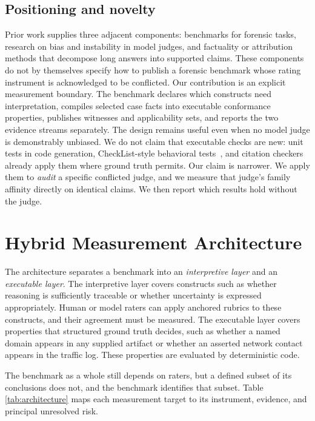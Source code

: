 \documentclass[conference]{IEEEtran}
\begin{document}
\subsection{Positioning and novelty}
Prior work supplies three adjacent components: benchmarks for forensic tasks,
research on bias and instability in model judges, and factuality or attribution
methods that decompose long answers into supported claims. These components do
not by themselves specify how to publish a forensic benchmark whose rating
instrument is acknowledged to be conflicted. Our contribution is an explicit
measurement boundary. The benchmark declares which constructs need
interpretation, compiles selected case facts into executable conformance
properties, publishes witnesses and applicability sets, and reports the two
evidence streams separately. The design remains useful even when no model judge
is demonstrably unbiased.
We do not claim that executable checks are new: unit tests in code generation,
CheckList-style behavioral tests~\cite{checklist}, and citation checkers already
apply them where ground truth permits. Our claim is narrower. We apply them to
\emph{audit} a specific conflicted judge, and we measure that judge's family
affinity directly on identical claims. We then report which results hold
without the judge.

\section{Hybrid Measurement Architecture}
The architecture separates a benchmark into an \emph{interpretive layer} and
an \emph{executable layer}. The interpretive layer covers constructs such as
whether reasoning is sufficiently traceable or whether uncertainty is expressed
appropriately. Human or model raters can apply anchored rubrics to these
constructs, and their agreement must be measured. The executable layer covers
properties that structured ground truth decides, such as whether a named domain
appears in any supplied artifact or whether an asserted network contact appears
in the traffic log. These properties are evaluated by deterministic code.

The benchmark as a whole still depends on raters, but a defined subset of its
conclusions does not, and the benchmark identifies that subset. Table
\ref{tab:architecture} maps each measurement target to its instrument, evidence,
and principal unresolved risk.
\end{document}
